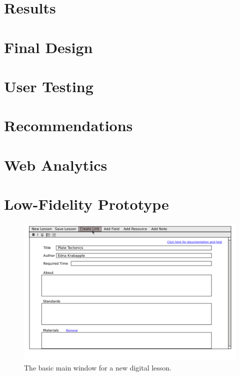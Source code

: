 \documentclass[10pt,letter]{article}
\begin{document}
\section{Results}

\section{Final Design}

\section{User Testing}

\section{Recommendations}

\section{Web Analytics}

\pagebreak
\appendix

\section{Low-Fidelity Prototype}
\begin{figure}[htb]
	\centering
	\includegraphics[width=0.9\linewidth]{../../low-fi_prototype/button_mouseover}
	\caption{The basic main window for a new digital lesson.}
	\label{fig: main window}
\end{figure}
\end{document}
